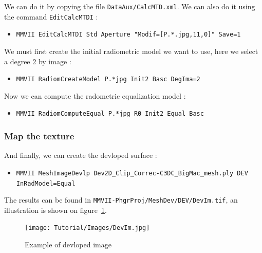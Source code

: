 We can do it by copying the file {\tt DataAux/CalcMTD.xml}. We can also
do it using the command {\tt EditCalcMTDI} :

\begin{itemize}
      \item {\tt MMVII  EditCalcMTDI Std Aperture "Modif=[P.*.jpg,11,0]"  Save=1}
\end{itemize}

We must first create the initial radiometric model  we want to use, here we select
a degree $2$ by image :

\begin{itemize}
	\item {\tt MMVII RadiomCreateModel P.*jpg Init2 Basc DegIma=2}
\end{itemize}

Now we can compute the radometric equalization model :

\begin{itemize}
	\item {\tt MMVII RadiomComputeEqual P.*jpg R0 Init2 Equal Basc}
\end{itemize}



\subsubsection{Map the texture}

And finally, we can create the devloped surface :


\begin{itemize}
	\item {\tt MMVII MeshImageDevlp Dev2D\_Clip\_Correc-C3DC\_BigMac\_mesh.ply  DEV InRadModel=Equal}
\end{itemize}

The results can be found in {\tt MMVII-PhgrProj/MeshDev/DEV/DevIm.tif}, an illustration is shown on figure~\ref{fig:TutDI:DevIm}.


\begin{figure}
\centering
	\texttt{[image: Tutorial/Images/DevIm.jpg]}
	\caption{Example of devloped image}
\label{fig:TutDI:DevIm}
\end{figure}




